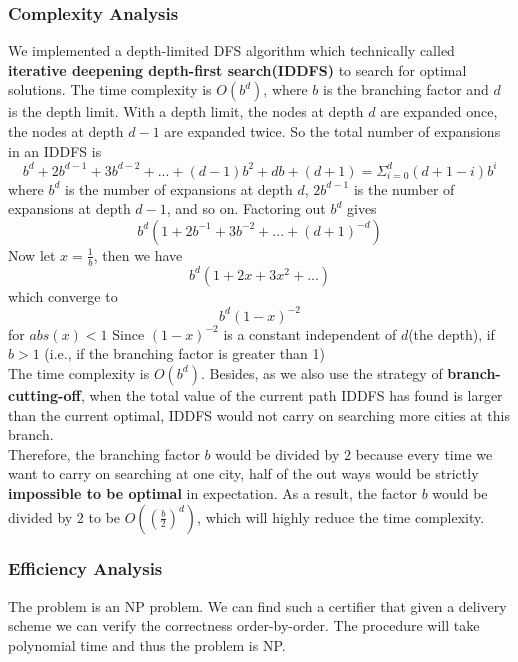 \documentclass{llncs}
\begin{document}
\subsubsection{Complexity Analysis}
We implemented a depth-limited DFS algorithm which technically called \textbf{iterative deepening depth-first search(IDDFS)} to search for optimal solutions. 
The time complexity is $O(b^d)$, where $b$ is the branching factor and $d$ is the depth limit.
With a depth limit, the nodes at depth $d$ are expanded once, the nodes at depth $d-1$ are expanded twice. So the total number of expansions in an IDDFS is
$$b^d + 2b^{d-1} + 3b^{d-2} + ... + (d-1)b^2 + db + (d+1) = \Sigma_{i=0}^{d} (d + 1 - i)b^i$$
where $b^d$ is the number of expansions at depth $d$, $2b^{d-1}$ is the number of expansions at depth $d-1$, and so on. Factoring out $b^d$ gives
$$b^d(1 + 2b^{-1} + 3 b^{-2} + ... + (d + 1)^{-d})$$
Now let $x = \frac{1}{b}$, then we have 
$$b^d(1 + 2x + 3x^2 + ... )$$ which converge to 
$$b^d(1 - x)^{-2}$$ for $abs(x) < 1$
Since $(1-x)^{-2}$ is a constant independent of $d$(the depth), if $b > 1$ (i.e., if the branching factor is greater than 1)\\
The time complexity is $O(b^d)$.
Besides, as we also use the strategy of \textbf{branch-cutting-off}, when the total value of the current path IDDFS has found is larger than the current optimal, IDDFS would not carry on searching more cities at this branch.\\
Therefore, the branching factor $b$ would be divided by $2$ because every time we want to carry on searching at one city, half of the out ways would be strictly \textbf{impossible to be optimal} in expectation. As a result, the factor $b$ would be divided by $2$ to be $O((\frac{b}{2})^d)$, which will highly reduce  the time complexity. 
\subsubsection{Efficiency Analysis}
The problem is an NP problem. We can find such a certifier that given a delivery scheme we can verify the correctness order-by-order. The procedure will take polynomial time and thus the problem is NP.
\end{document}
